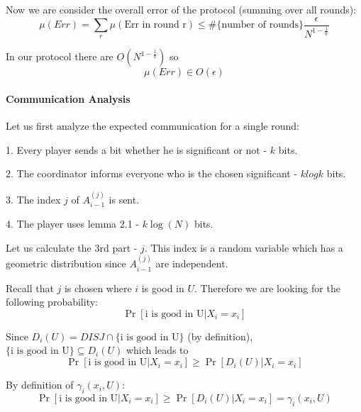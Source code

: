 Now we are consider the overall error of the protocol (summing over all rounds):
\begin{equation*}
  \mu(Err) = \sum_{r} \mu(\text{Err in round r}) \leq \#\{\text{number of rounds}\} \frac{\epsilon}{N^{1-\frac{1}{k}}}
\end{equation*}

In our protocol there are $O(N^{1-\frac{1}{k}})$ so
\begin{equation*}
  \mu(Err) \in O(\epsilon)
\end{equation*}

\paragraph{Communication Analysis}
Let us first analyze the expected communication for a single round: \newline

1. Every player sends a bit whether he is significant or not - $k$ bits.\newline

2. The coordinator informs everyone who is the chosen significant - $klogk$ bits. \newline

3. The index $j$ of $A_{i-1}^{(j)}$ is sent. \newline

4. The player uses lemma 2.1 - $k\log(N)$ bits. \newline

Let us calculate the 3rd part - $j$. \newline
This index is a random variable which has a geometric distribution since $A_{i-1}^{(j)}$ are independent. \newline

Recall that $j$ is chosen where $i$ is good in $U$. \newline
Therefore we are looking for the following probability:
\begin{equation*}
    \Pr[\text{i is good in U}| X_i = x_i]
\end{equation*}

Since $D_i(U) = DISJ \cap \{\text{i is good in U}\}$ (by definition), $\{\text{i is good in U}\} \subseteq D_i(U)$ which leads to 
\begin{equation*}
    \Pr[\text{i is good in U}| X_i = x_i] \geq \Pr[D_i(U) | X_i = x_i]
\end{equation*}

By definition of $\gamma_i(x_i, U)$:
\begin{equation*}
    \Pr[\text{i is good in U}| X_i = x_i] \geq \Pr[D_i(U) | X_i = x_i] = \gamma_i(x_i, U)
\end{equation*}

